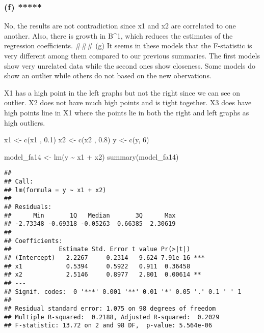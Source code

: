 \documentclass[
]{article}
\newenvironment{Shaded}{\begin{snugshade}}{\end{snugshade}}
\newcommand{\DecValTok}[1]{\textcolor[rgb]{0.00,0.00,0.81}{#1}}
\newcommand{\FloatTok}[1]{\textcolor[rgb]{0.00,0.00,0.81}{#1}}
\newcommand{\FunctionTok}[1]{\textcolor[rgb]{0.00,0.00,0.00}{#1}}
\newcommand{\NormalTok}[1]{#1}
\newcommand{\OtherTok}[1]{\textcolor[rgb]{0.56,0.35,0.01}{#1}}
\newcommand{\SpecialCharTok}[1]{\textcolor[rgb]{0.00,0.00,0.00}{#1}}
\begin{document}
\hypertarget{f-3}{%
\subsubsection{(f) *****}\label{f-3}}

No, the results are not contradiction since x1 and x2 are correlated to
one another. Also, there is growth in B\^{}1, which reduces the
estimates of the regression coefficients. \#\#\# (g) It seems in these
models that the F-statistic is very different among them compared to our
previous summaries. The first models show very unrelated data while the
second ones show closeness. Some models do show an outlier while others
do not based on the new obervations.

X1 has a high point in the left graphs but not the right since we can
see on outlier. X2 does not have much high points and is tight together.
X3 does have high points line in X1 where the points lie in both the
right and left graphs as high outliers.

\begin{Shaded}
\begin{Highlighting}[]
\NormalTok{x1 }\OtherTok{\textless{}{-}} \FunctionTok{c}\NormalTok{(x1 , }\FloatTok{0.1}\NormalTok{)}
\NormalTok{x2 }\OtherTok{\textless{}{-}} \FunctionTok{c}\NormalTok{(x2 , }\FloatTok{0.8}\NormalTok{)}
\NormalTok{y }\OtherTok{\textless{}{-}} \FunctionTok{c}\NormalTok{(y, }\DecValTok{6}\NormalTok{)}

\NormalTok{model\_fa14 }\OtherTok{\textless{}{-}} \FunctionTok{lm}\NormalTok{(y }\SpecialCharTok{\textasciitilde{}}\NormalTok{ x1 }\SpecialCharTok{+}\NormalTok{ x2)}
\FunctionTok{summary}\NormalTok{(model\_fa14)}
\end{Highlighting}
\end{Shaded}

\begin{verbatim}
## 
## Call:
## lm(formula = y ~ x1 + x2)
## 
## Residuals:
##      Min       1Q   Median       3Q      Max 
## -2.73348 -0.69318 -0.05263  0.66385  2.30619 
## 
## Coefficients:
##             Estimate Std. Error t value Pr(>|t|)    
## (Intercept)   2.2267     0.2314   9.624 7.91e-16 ***
## x1            0.5394     0.5922   0.911  0.36458    
## x2            2.5146     0.8977   2.801  0.00614 ** 
## ---
## Signif. codes:  0 '***' 0.001 '**' 0.01 '*' 0.05 '.' 0.1 ' ' 1
## 
## Residual standard error: 1.075 on 98 degrees of freedom
## Multiple R-squared:  0.2188, Adjusted R-squared:  0.2029 
## F-statistic: 13.72 on 2 and 98 DF,  p-value: 5.564e-06
\end{verbatim}
\end{document}
